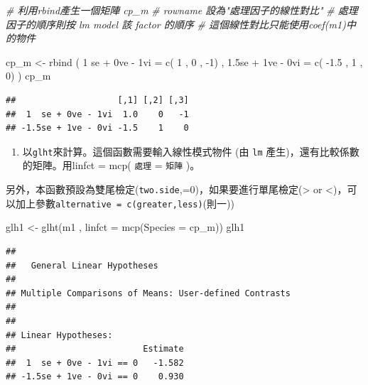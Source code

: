 \documentclass[
]{book}
\newenvironment{Shaded}{\begin{snugshade}}{\end{snugshade}}
\newcommand{\AttributeTok}[1]{\textcolor[rgb]{0.77,0.63,0.00}{#1}}
\newcommand{\CommentTok}[1]{\textcolor[rgb]{0.56,0.35,0.01}{\textit{#1}}}
\newcommand{\DecValTok}[1]{\textcolor[rgb]{0.00,0.00,0.81}{#1}}
\newcommand{\FloatTok}[1]{\textcolor[rgb]{0.00,0.00,0.81}{#1}}
\newcommand{\FunctionTok}[1]{\textcolor[rgb]{0.00,0.00,0.00}{#1}}
\newcommand{\NormalTok}[1]{#1}
\newcommand{\OtherTok}[1]{\textcolor[rgb]{0.56,0.35,0.01}{#1}}
\newcommand{\SpecialCharTok}[1]{\textcolor[rgb]{0.00,0.00,0.00}{#1}}
\newcommand{\StringTok}[1]{\textcolor[rgb]{0.31,0.60,0.02}{#1}}
\providecommand{\tightlist}{%
  \setlength{\itemsep}{0pt}\setlength{\parskip}{0pt}}
\begin{document}
\begin{Shaded}
\begin{Highlighting}[]
\CommentTok{\# 利用rbind產生一個矩陣 cp\_m}
\CommentTok{\# rowname 設為"處理因子的線性對比"}
\CommentTok{\# 處理因子的順序則按 lm model 該 factor 的順序}
\CommentTok{\# 這個線性對比只能使用coef(m1)中的物件}


\NormalTok{cp\_m }\OtherTok{\textless{}{-}} \FunctionTok{rbind}\NormalTok{ ( }\StringTok{\textquotesingle{} 1  se + 0ve {-} 1vi\textquotesingle{}} \OtherTok{=} \FunctionTok{c}\NormalTok{( }\DecValTok{1}\NormalTok{ , }\DecValTok{0}\NormalTok{ , }\SpecialCharTok{{-}}\DecValTok{1}\NormalTok{) ,}
                \StringTok{\textquotesingle{}{-}1.5se + 1ve {-} 0vi\textquotesingle{}} \OtherTok{=} \FunctionTok{c}\NormalTok{( }\SpecialCharTok{{-}}\FloatTok{1.5}\NormalTok{ , }\DecValTok{1}\NormalTok{ , }\DecValTok{0}\NormalTok{) )}
\NormalTok{cp\_m}
\end{Highlighting}
\end{Shaded}

\begin{verbatim}
##                    [,1] [,2] [,3]
##  1  se + 0ve - 1vi  1.0    0   -1
## -1.5se + 1ve - 0vi -1.5    1    0
\end{verbatim}

\begin{enumerate}
\def\labelenumi{\arabic{enumi}.}
\setcounter{enumi}{1}
\tightlist
\item
  以\texttt{glht}來計算。這個函數需要輸入線性模式物件 (由 \texttt{lm} 產生)，還有比較係數的矩陣。用linfct = mcp( \texttt{處理} = \texttt{矩陣} )。
\end{enumerate}

另外，本函數預設為雙尾檢定(\texttt{two.side},=0)，如果要進行單尾檢定(\textgreater{} or \textless)，可以加上參數\texttt{alternative\ =\ c(\textquotesingle{}greater\textquotesingle{},\textquotesingle{}less\textquotesingle{})}(則一))

\begin{Shaded}
\begin{Highlighting}[]
\NormalTok{glh1 }\OtherTok{\textless{}{-}} \FunctionTok{glht}\NormalTok{(m1 ,}
             \AttributeTok{linfct =} \FunctionTok{mcp}\NormalTok{(}\AttributeTok{Species =}\NormalTok{ cp\_m))}
\NormalTok{glh1}
\end{Highlighting}
\end{Shaded}

\begin{verbatim}
## 
##   General Linear Hypotheses
## 
## Multiple Comparisons of Means: User-defined Contrasts
## 
## 
## Linear Hypotheses:
##                         Estimate
##  1  se + 0ve - 1vi == 0   -1.582
## -1.5se + 1ve - 0vi == 0    0.930
\end{verbatim}
\end{document}
